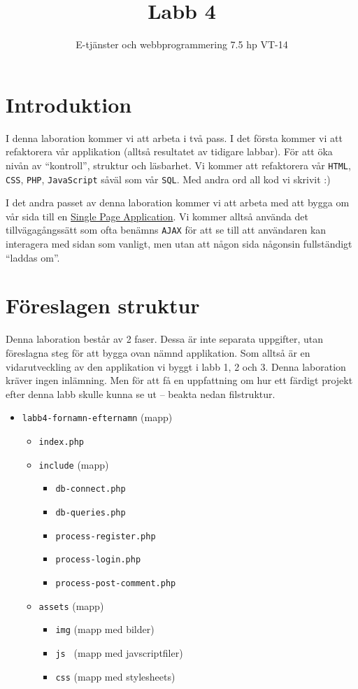\documentclass[12pt]{article}
\date{}
\title{ Labb 4 }
\author{ E-tjänster och webbprogrammering 7.5 hp VT-14 }
\begin{document}
\maketitle
\vspace{-2em}



\section{Introduktion}
I denna laboration kommer vi att arbeta i två pass. I det första kommer vi att refaktorera vår applikation (alltså resultatet av tidigare labbar). För att öka nivån av ``kontroll'', struktur och läsbarhet. Vi kommer att refaktorera vår \texttt{HTML}, \texttt{CSS}, \texttt{PHP}, \texttt{JavaScript} såväl som vår \texttt{SQL}. Med andra ord all kod vi skrivit :)

I det andra passet av denna laboration kommer vi att arbeta med att bygga om vår sida till en \href{http://en.wikipedia.org/wiki/Single-page_application}{Single Page Application}. Vi kommer alltså använda det tillvägagångssätt som ofta benämns \texttt{AJAX} för att se till att användaren kan interagera med sidan som vanligt, men utan att någon sida någonsin fullständigt ``laddas om''.

\section{Föreslagen struktur}
Denna laboration består av 2 faser. Dessa är inte separata uppgifter, utan föreslagna steg för att bygga ovan nämnd applikation. Som alltså är en vidarutveckling av den applikation vi byggt i labb 1, 2 och 3. Denna laboration kräver ingen inlämning. Men för att få en uppfattning om hur ett färdigt projekt efter denna labb skulle kunna se ut -- beakta nedan filstruktur.
\begin{itemize}
  \item \texttt{labb4-fornamn-efternamn} (mapp)
  \begin{itemize}
    \item \texttt{index.php}
    \item \texttt{include} (mapp)
      \begin{itemize}
        \item \texttt{db-connect.php}
        \item \texttt{db-queries.php}
        \item \texttt{process-register.php}
        \item \texttt{process-login.php}
        \item \texttt{process-post-comment.php}
      \end{itemize}
    \item \texttt{assets} (mapp)
    \begin{itemize}
      \item \texttt{img} (mapp med bilder)
      \item \texttt{js } (mapp med javscriptfiler)
      \item \texttt{css} (mapp med stylesheets)
    \end{itemize}
  \end{itemize}
\end{itemize}
\end{document}
